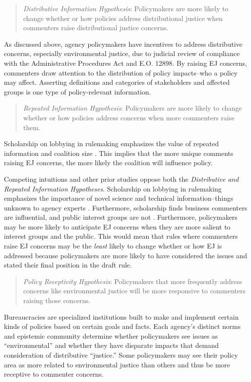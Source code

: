\documentclass[
      12pt,
        ]{article}
\begin{document}
\begin{quote}
\emph{Distributive Information Hypothesis}: Policymakers are more likely to change whether or how policies address distributional justice when commenters raise distributional justice concerns.
\end{quote}

As discussed above, agency policymakers have incentives to address distributive concerns, especially environmental justice, due to judicial review of compliance with the Administrative Procedures Act and E.O. 12898. By raising EJ concerns, commenters draw attention to the distribution of policy impacts--who a policy may affect. Asserting definitions and categories of stakeholders and affected groups is one type of policy-relevant information.

\begin{quote}
\emph{Repeated Information Hypothesis}: Policymakers are more likely to change whether or how policies address concerns when more commenters raise them.
\end{quote}

Scholarship on lobbying in rulemaking emphasizes the value of repeated information and coalition size \citep{Nelson2012}. This implies that the more unique comments raising EJ concerns, the more likely the coalition will influence policy.

Competing intuitions and other prior studies oppose both the \emph{Distributive and Repeated Information Hypotheses}. Scholarship on lobbying in rulemaking emphasizes the importance of novel science and technical information--things unknown to agency experts \citep{Wagner2010}. Furthermore, scholarship finds business commenters are influential, and public interest groups are not \citep[\citet{Haeder2015}]{Yackee2006JOP}. Furthermore, policymakers may be more likely to anticipate EJ concerns when they are more salient to interest groups and the public. This would mean that rules where commenters raise EJ concerns may be the \emph{least} likely to change whether or how EJ is addressed because policymakers are more likely to have considered the issues and stated their final position in the draft rule.

\begin{quote}
\emph{Policy Receptivity Hypothesis}: Policymakers that more frequently address concerns like environmental justice will be more responsive to commenters raising those concerns.
\end{quote}

Bureaucracies are specialized institutions built to make and implement certain kinds of policies based on certain goals and facts. Each agency's distinct norms and epistemic community determine whether policymakers see issues as ``environmental'' and whether they have disparate impacts that demand consideration of distributive ``justice.'' Some policymakers may see their policy area as more related to environmental justice than others and thus be more receptive to commenter concerns.
\end{document}
